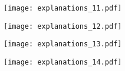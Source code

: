\documentclass[varwidth,border=10pt]{standalone}
\begin{document}
\begin{figure}
\begin{subfigure}{.19\textwidth}
\centering\texttt{[image: explanations\_11.pdf]}
\end{subfigure}
%
\begin{subfigure}{.19\textwidth}
\centering\texttt{[image: explanations\_12.pdf]}
\end{subfigure}
%
\begin{subfigure}{.19\textwidth}
\centering\texttt{[image: explanations\_13.pdf]}
\end{subfigure}
%
\begin{subfigure}{.19\textwidth}
\centering\texttt{[image: explanations\_14.pdf]}
\end{subfigure}
\end{figure}
\end{document}
